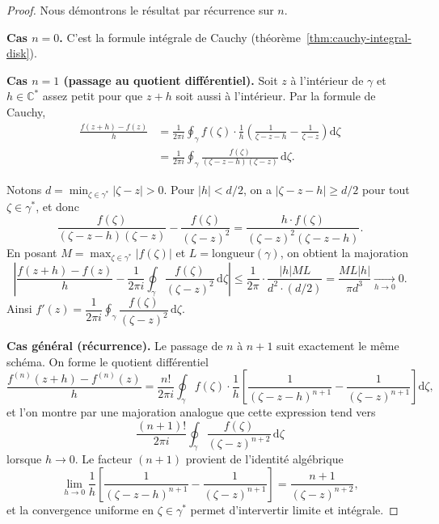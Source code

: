 \documentclass[12pt,a4paper,openany]{book}
\theoremstyle{definition}
\theoremstyle{plain}
\theoremstyle{remark}
\newcommand{\C}{\mathbb{C}}
\newcommand{\dd}{\mathrm{d}}
\newcommand{\abs}[1]{\left|#1\right|}
\begin{document}
\begin{proof}
Nous démontrons le résultat par récurrence sur $n$.

\medskip
\noindent\textbf{Cas $n = 0$.}
C'est la formule intégrale de Cauchy (théorème~\ref{thm:cauchy-integral-disk}).

\medskip
\noindent\textbf{Cas $n = 1$ (passage au quotient différentiel).}
Soit $z$ à l'intérieur de $\gamma$ et $h \in \C^*$ assez petit pour
que $z + h$ soit aussi à l'intérieur. Par la formule de Cauchy,
\begin{align*}
  \frac{f(z+h) - f(z)}{h}
  &= \frac{1}{2\pi i} \oint_\gamma f(\zeta)
     \cdot \frac{1}{h}\left(\frac{1}{\zeta - z - h}
     - \frac{1}{\zeta - z}\right)\dd\zeta \\
  &= \frac{1}{2\pi i} \oint_\gamma
     \frac{f(\zeta)}{(\zeta - z - h)(\zeta - z)}\,\dd\zeta.
\end{align*}

Notons $d = \min_{\zeta \in \gamma^*} \abs{\zeta - z} > 0$. Pour
$\abs{h} < d/2$, on a $\abs{\zeta - z - h} \geq d/2$ pour tout
$\zeta \in \gamma^*$, et donc
\[
  \frac{f(\zeta)}{(\zeta - z - h)(\zeta - z)}
  - \frac{f(\zeta)}{(\zeta - z)^2}
  = \frac{h \cdot f(\zeta)}{(\zeta - z)^2(\zeta - z - h)}.
\]
En posant $M = \max_{\zeta \in \gamma^*} \abs{f(\zeta)}$ et
$L = \text{longueur}(\gamma)$, on obtient la majoration
\[
  \abs{\frac{f(z+h) - f(z)}{h}
  - \frac{1}{2\pi i}\oint_\gamma \frac{f(\zeta)}{(\zeta-z)^2}\,\dd\zeta}
  \leq \frac{1}{2\pi} \cdot \frac{\abs{h} M L}{d^2 \cdot (d/2)}
  = \frac{M L \abs{h}}{\pi d^3} \xrightarrow[h \to 0]{} 0.
\]
Ainsi $f'(z) = \dfrac{1}{2\pi i}\displaystyle\oint_\gamma
\dfrac{f(\zeta)}{(\zeta - z)^2}\,\dd\zeta$.

\medskip
\noindent\textbf{Cas général (récurrence).}
Le passage de $n$ à $n+1$ suit exactement le même schéma. On forme
le quotient différentiel
\[
  \frac{f^{(n)}(z+h) - f^{(n)}(z)}{h}
  = \frac{n!}{2\pi i}\oint_\gamma f(\zeta) \cdot \frac{1}{h}
    \left[\frac{1}{(\zeta - z - h)^{n+1}}
    - \frac{1}{(\zeta - z)^{n+1}}\right]\dd\zeta,
\]
et l'on montre par une majoration analogue que cette expression tend vers
\[
  \frac{(n+1)!}{2\pi i}\oint_\gamma
  \frac{f(\zeta)}{(\zeta - z)^{n+2}}\,\dd\zeta
\]
lorsque $h \to 0$. Le facteur $(n+1)$ provient de l'identité algébrique
\[
  \lim_{h \to 0} \frac{1}{h}\left[\frac{1}{(\zeta - z - h)^{n+1}}
  - \frac{1}{(\zeta - z)^{n+1}}\right]
  = \frac{n+1}{(\zeta - z)^{n+2}},
\]
et la convergence uniforme en $\zeta \in \gamma^*$ permet d'intervertir
limite et intégrale.
\end{proof}
\end{document}
